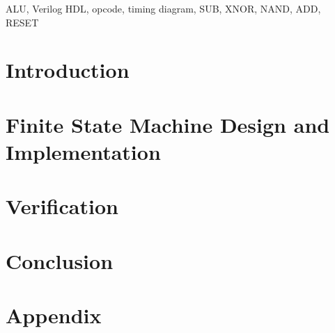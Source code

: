 \documentclass[conference]{IEEEtran}
\begin{document}
    \begin{IEEEkeywords}
        ALU, Verilog HDL,  opcode, timing diagram, SUB, XNOR, NAND, ADD, RESET
    \end{IEEEkeywords}


    \section{Introduction}\label{sec:introduction}
    


    \section{Finite State Machine Design and Implementation}\label{sec:FSM}
    


    \section{Verification}\label{sec:verification}
    


    \section{Conclusion}\label{sec:conclusion}
    

    \appendix


    \section{Appendix}\label{sec:appendix}
    
\end{document}
